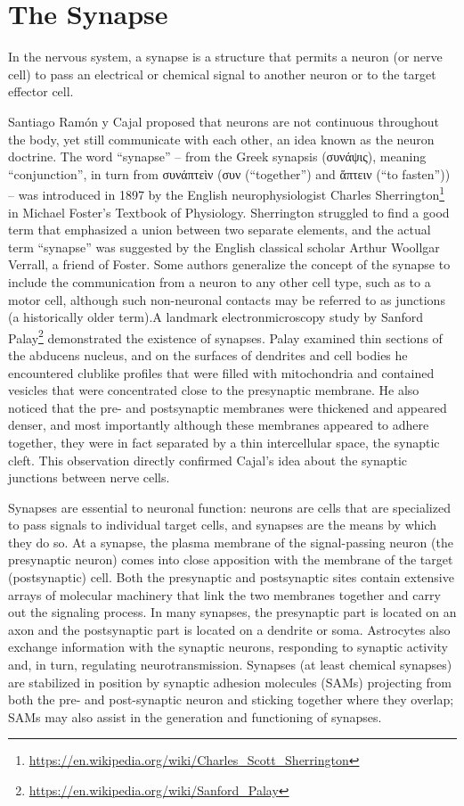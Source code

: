 \documentclass[]{book}
\let\rmarkdownfootnote\footnote%
\def\footnote{\protect\rmarkdownfootnote}
\renewcommand{\href}[2]{#2\footnote{\url{#1}}}
\begin{document}
\hypertarget{the-synapse}{%
\section{The Synapse}\label{the-synapse}}

In the nervous system, a synapse is a structure that permits a neuron (or nerve cell) to pass an electrical or chemical signal to another neuron or to the target effector cell.

Santiago Ramón y Cajal proposed that neurons are not continuous throughout the body, yet still communicate with each other, an idea known as the neuron doctrine. The word ``synapse'' -- from the Greek synapsis (συνάψις), meaning ``conjunction'', in turn from συνάπτεὶν (συν (``together'') and ἅπτειν (``to fasten'')) -- was introduced in 1897 by the English neurophysiologist \href{https://en.wikipedia.org/wiki/Charles_Scott_Sherrington}{Charles Sherrington} in Michael Foster's Textbook of Physiology. Sherrington struggled to find a good term that emphasized a union between two separate elements, and the actual term ``synapse'' was suggested by the English classical scholar Arthur Woollgar Verrall, a friend of Foster. Some authors generalize the concept of the synapse to include the communication from a neuron to any other cell type, such as to a motor cell, although such non-neuronal contacts may be referred to as junctions (a historically older term).A landmark electronmicroscopy study by \href{https://en.wikipedia.org/wiki/Sanford_Palay}{Sanford Palay} demonstrated the existence of synapses. Palay examined thin sections of the abducens nucleus, and on the surfaces of dendrites and cell bodies he encountered clublike profiles that were filled with mitochondria and contained vesicles that were concentrated close to the presynaptic membrane. He also noticed that the pre- and postsynaptic membranes were thickened and appeared denser, and most importantly although these membranes appeared to adhere together, they were in fact separated by a thin intercellular space, the synaptic cleft. This observation directly confirmed Cajal's idea about the synaptic junctions between nerve cells.

Synapses are essential to neuronal function: neurons are cells that are specialized to pass signals to individual target cells, and synapses are the means by which they do so. At a synapse, the plasma membrane of the signal-passing neuron (the presynaptic neuron) comes into close apposition with the membrane of the target (postsynaptic) cell. Both the presynaptic and postsynaptic sites contain extensive arrays of molecular machinery that link the two membranes together and carry out the signaling process. In many synapses, the presynaptic part is located on an axon and the postsynaptic part is located on a dendrite or soma. Astrocytes also exchange information with the synaptic neurons, responding to synaptic activity and, in turn, regulating neurotransmission. Synapses (at least chemical synapses) are stabilized in position by synaptic adhesion molecules (SAMs) projecting from both the pre- and post-synaptic neuron and sticking together where they overlap; SAMs may also assist in the generation and functioning of synapses.
\end{document}
